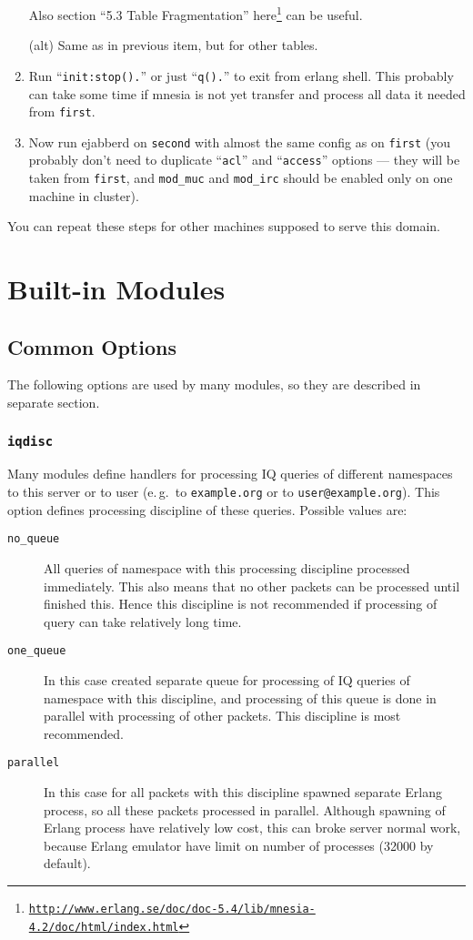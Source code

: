 \documentclass[a4paper,10pt]{article}
\newcommand{\bracehack}{\def\{{\char"7B}\def\}{\char"7D}}
\newcommand{\jid}[1]{\texttt{#1}}
\newcommand{\option}[1]{\texttt{#1}}
\newcommand{\term}[1]{\texttt{#1}}
\newcommand{\titem}[1]{\item[\bracehack\texttt{#1}]}
\gdef\footahref#1#2{#2\footnote{\href{#1}{\texttt{#1}}}}
\begin{document}
\begin{enumerate}
  Also section ``5.3 Table Fragmentation''
  \footahref{http://www.erlang.se/doc/doc-5.4/lib/mnesia-4.2/doc/html/index.html}{here}
  can be useful.
  
  (alt) Same as in previous item, but for other tables.

  
\item Run ``\verb|init:stop().|'' or just ``\verb|q().|'' to exit from
  erlang shell.  This probably can take some time if mnesia is not yet
  transfer and process all data it needed from \term{first}.

  
\item Now run ejabberd on \term{second} with almost the same config as
  on \term{first} (you probably don't need to duplicate ``\verb|acl|''
  and ``\verb|access|'' options --- they will be taken from
  \term{first}, and \verb|mod_muc| and \verb|mod_irc| should be
  enabled only on one machine in cluster).
\end{enumerate}

You can repeat these steps for other machines supposed to serve this
domain.


\appendix{}

\section{Built-in Modules}
\label{sec:modules}

\subsection{Common Options}
\label{sec:modcommonopts}

The following options are used by many modules, so they are described in
separate section.

\subsubsection{\option{iqdisc}}
\label{sec:modiqdiscoption}

Many modules define handlers for processing IQ queries of different namespaces
to this server or to user (e.\,g.\ to \jid{example.org} or to
\jid{user@example.org}).  This option defines processing discipline of
these queries.  Possible values are:
\begin{description}
\titem{no\_queue} All queries of namespace with this processing
  discipline processed immediately.  This also means that no other packets can
  be processed until finished this.  Hence this discipline is not recommended
  if processing of query can take relatively long time.
\titem{one\_queue} In this case created separate queue for processing
  of IQ queries of namespace with this discipline, and processing of this queue
  is done in parallel with processing of other packets. This discipline is most
  recommended.
\titem{parallel} In this case for all packets with this discipline
  spawned separate Erlang process, so all these packets processed in parallel.
  Although spawning of Erlang process have relatively low cost, this can broke
  server normal work, because Erlang emulator have limit on number of processes
  (32000 by default).
\end{description}
\end{document}
